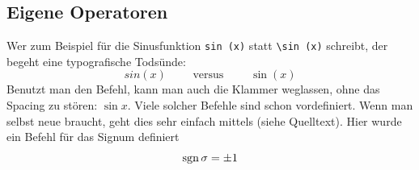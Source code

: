 \subsection{Eigene Operatoren} %
Wer zum Beispiel für die Sinusfunktion \texttt{sin (x)} statt \texttt{\textbackslash{}sin (x)} schreibt, der begeht eine typografische Todsünde:
\[
	sin (x) \qquad \text{ versus } \qquad \sin (x)
\]
Benutzt man den Befehl, kann man auch die Klammer weglassen, ohne das Spacing zu stören: $\sin x$.
Viele solcher Befehle sind schon vordefiniert. Wenn man selbst neue braucht, geht dies sehr einfach mittels  (siehe Quelltext). Hier wurde ein
Befehl für das Signum definiert
\[
	\operatorname{sgn} \sigma = \pm 1
\]

\appendix %
\printbibliography

